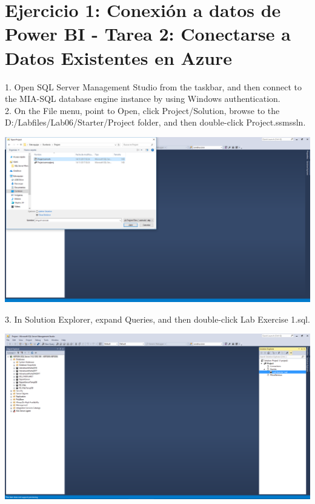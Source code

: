 \section{Ejercicio 1: Conexión a datos de Power BI - Tarea 2: Conectarse a Datos Existentes en Azure} 

1. Open SQL Server Management Studio from the taskbar, and then connect to the MIA-SQL database engine instance by using Windows authentication.\\
2. On the File menu, point to Open, click Project/Solution, browse to the D:/Labfiles/Lab06/Starter/Project folder, and then double-click Project.ssmssln.

	\begin{center}
	\includegraphics[width=17cm]{./Imagenes/Ejercicio1/Tarea2/1}
	\end{center}	

3. In Solution Explorer, expand Queries, and then double-click Lab Exercise 1.sql.\\

	\begin{center}
	\includegraphics[width=17cm]{./Imagenes/Ejercicio1/Tarea2/2}
	\end{center}	

